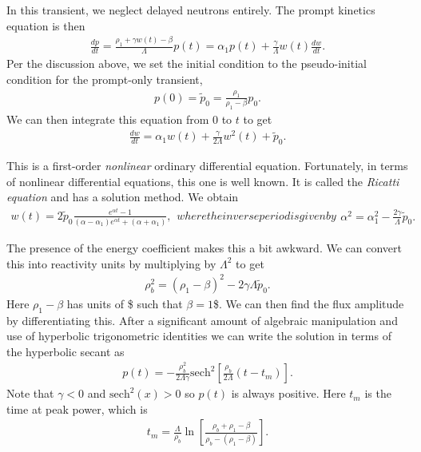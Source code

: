 In this transient, we neglect delayed neutrons entirely. The prompt kinetics equation is then
\begin{align}
  \frac{dp}{dt} = \frac{ \rho_1 + \gamma w(t) - \beta }{ \Lambda } p(t) = \alpha_1 p(t) + \frac{\gamma}{\Lambda} w(t) \frac{dw}{dt} .
\end{align}
Per the discussion above, we set the initial condition to the pseudo-initial condition for the prompt-only transient,
\begin{align}
  p(0) = \tilde{p}_0 = \frac{ \rho_1 }{ \rho_1 - \beta } p_0.
\end{align}
We can then integrate this equation from $0$ to $t$ to get
\begin{align}
  \frac{dw}{dt} = \alpha_1 w(t) + \frac{\gamma}{2 \Lambda} w^2(t) + \tilde{p}_0.
\end{align}

This is a first-order \emph{nonlinear} ordinary differential equation. Fortunately, in terms of nonlinear differential equations, this one is well known. It is called the \emph{Ricatti equation} and has a solution method. We obtain
\begin{subequations}
\begin{align}
  w(t) = 2 \tilde{p}_0  \frac{ e^{\alpha t} - 1 }{ ( \alpha - \alpha_1 ) e^{\alpha t} + ( \alpha + \alpha_1 ) },
\end{align}
where the inverse period is given by
\begin{align}
  \alpha^2 = \alpha_1^2 - \frac{2\gamma}{\Lambda} \tilde{p}_0 .
\end{align}
\end{subequations}

The presence of the energy coefficient makes this a bit awkward. We can convert this into reactivity units by multiplying by $\Lambda^2$ to get
\begin{align}
  \rho_b^2 = ( \rho_1 - \beta )^2 - 2 \gamma \Lambda \tilde{p}_0 .
\end{align}
Here $\rho_1 - \beta$ has units of \$ such that $\beta = 1$\$. We can then find the flux amplitude by differentiating this. After a significant amount of algebraic manipulation and use of hyperbolic trigonometric identities we can write the solution in terms of the hyperbolic secant as
\begin{align}
  p(t) = -\frac{\rho_b^2}{2\Lambda\gamma} \textrm{sech}^2 \left[ \frac{\rho_b}{2\Lambda} ( t - t_m ) \right] .
\end{align}
Note that $\gamma < 0$ and $\textrm{sech}^2(x) > 0$ so $p(t)$ is always positive. Here $t_m$ is the time at peak power, which is
\begin{align}
  t_m = \frac{\Lambda}{\rho_b} \ln \left[ \frac{ \rho_b + \rho_1 - \beta }{ \rho_b - ( \rho_1 - \beta )  } \right] .
\end{align}

